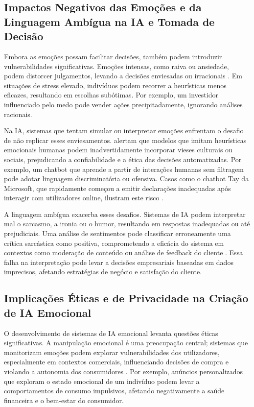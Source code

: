 \documentclass[a4paper,12pt]{report}
\begin{document}
	\subsection{Impactos Negativos das Emoções e da Linguagem Ambígua na IA e Tomada de Decisão}
	
	Embora as emoções possam facilitar decisões, também podem introduzir vulnerabilidades significativas. Emoções intensas, como raiva ou ansiedade, podem distorcer julgamentos, levando a decisões enviesadas ou irracionais \parencite{bechara2000}. Em situações de stress elevado, indivíduos podem recorrer a heurísticas menos eficazes, resultando em escolhas subótimas. Por exemplo, um investidor influenciado pelo medo pode vender ações precipitadamente, ignorando análises racionais.
	
	Na IA, sistemas que tentam simular ou interpretar emoções enfrentam o desafio de não replicar esses enviesamentos. \textcite{russell2020} alertam que modelos que imitam heurísticas emocionais humanas podem inadvertidamente incorporar vieses culturais ou sociais, prejudicando a confiabilidade e a ética das decisões automatizadas. Por exemplo, um chatbot que aprende a partir de interações humanas sem filtragem pode adotar linguagem discriminatória ou ofensiva. Casos como o chatbot Tay da Microsoft, que rapidamente começou a emitir declarações inadequadas após interagir com utilizadores online, ilustram este risco \parencite{neff2016}.
	
	A linguagem ambígua exacerba esses desafios. Sistemas de IA podem interpretar mal o sarcasmo, a ironia ou o humor, resultando em respostas inadequadas ou até prejudiciais. Uma análise de sentimentos pode classificar erroneamente uma crítica sarcástica como positiva, comprometendo a eficácia do sistema em contextos como moderação de conteúdo ou análise de feedback do cliente \parencite{slovic2007}. Essa falha na interpretação pode levar a decisões empresariais baseadas em dados imprecisos, afetando estratégias de negócio e satisfação do cliente.
	
	\subsection{Implicações Éticas e de Privacidade na Criação de IA Emocional}
	
	O desenvolvimento de sistemas de IA emocional levanta questões éticas significativas. A manipulação emocional é uma preocupação central; sistemas que monitorizam emoções podem explorar vulnerabilidades dos utilizadores, especialmente em contextos comerciais, influenciando decisões de compra e violando a autonomia dos consumidores \parencite{pessoa2008}. Por exemplo, anúncios personalizados que exploram o estado emocional de um indivíduo podem levar a comportamentos de consumo impulsivos, afetando negativamente a saúde financeira e o bem-estar do consumidor.
	
\end{document}
